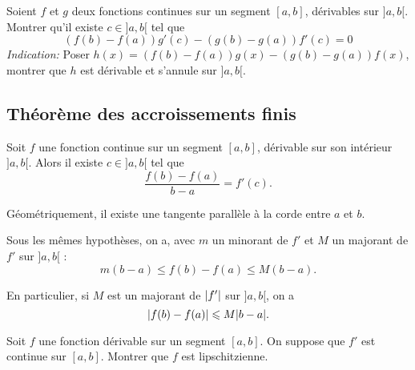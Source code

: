 \documentclass[../main.tex]{subfiles}
\begin{document}
\begin{exo}
Soient $f$ et $g$ deux fonctions continues sur un segment $[a,b]$, dérivables sur $]a,b[$. Montrer qu'il existe $c\in{]a,b[}$ tel que 
\[
(f(b)-f(a))g'(c) - (g(b)-g(a))f'(c) = 0
\]
\textit{Indication:} Poser $h(x) = (f(b)-f(a))g(x) - (g(b)-g(a))f(x)$, montrer que $h$ est dérivable et s'annule sur $]a,b[$.
\end{exo}

\subsection{Théorème des accroissements finis}

\begin{thm}
Soit $f$ une fonction continue sur un segment $[a,b]$, dérivable sur son intérieur ${]a,b[}$. Alors il existe $c\in{]a,b[}$ tel que
\[
\frac{f(b)-f(a)}{b-a} = f'(c).
\]

Géométriquement, il existe une tangente parallèle à la corde entre $a$ et $b$.
\end{thm}

\begin{cor}
Sous les mêmes hypothèses, on a, avec $m$ un minorant de $f'$ et $M$ un majorant de $f'$ sur $]a,b[$ :
\[
m(b-a) \leq f(b) - f(a) \leq M(b-a).
\]

En particulier, si $M$ est un majorant de $\lvert f'\rvert$ sur $]a,b[$, on a
\[
\lvert f(b)-f(a)\rvert \leqslant M\lvert b-a\rvert.
\]
\end{cor}

\begin{exo}[M]
Soit $f$ une fonction dérivable sur un segment $[a,b]$. On suppose que $f'$ est continue sur $[a,b]$. Montrer que $f$ est lipschitzienne.
\end{exo}
\end{document}
